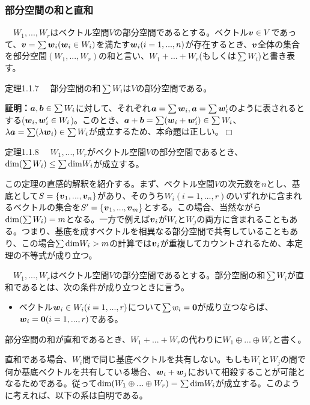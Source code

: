 \documentclass[dvipdfmx, 9pt, a4paper]{jsarticle}
\numberwithin{equation}{subsection}
\newcommand{\bm}[1]{{\mbox{\boldmath $#1$}}}
\def\qed{\hfill $\Box$}
\begin{document}
\subsubsection{部分空間の和と直和}
\begin{tcolorbox}[title=部分空間の和]
　$W_1, ..., W_r$はベクトル空間$V$の部分空間であるとする。ベクトル$\bm v \in V$であって、$\bm v = \sum \bm w_i (\bm w_i \in W_i)$を満たす$\bm w_i(i=1, ..., n)$が存在するとき、$\bm v$全体の集合を部分空間$(W_1, ..., W_r)$の和と言い、$W_1 + ... + W_r$(もしくは$\sum W_i$)と書き表す。
\end{tcolorbox}
\begin{itembox}[l]{定理1.1.7}
　部分空間の和$\sum W_i$は$V$の部分空間である。
\end{itembox}
{\bf 証明：}$\bm a, \bm b \in \sum W_i$に対して、それぞれ$\bm a=\sum \bm w_i, \bm a=\sum \bm w'_i$のように表されるとする($\bm w_i, \bm w'_i \in W_i$)。このとき、$\bm a+\bm b = \sum (\bm w_i+\bm w'_i) \in \sum W_i$、$\lambda \bm a = \sum (\lambda \bm w_i) \in \sum W_i$が成立するため、本命題は正しい。\qed
\begin{itembox}[l]{定理1.1.8}
　$W_1, ..., W_r$がベクトル空間$V$の部分空間であるとき、${\rm dim}(\sum W_i) \leq \sum {\rm dim}W_i$が成立する。
\end{itembox}\par
この定理の直感的解釈を紹介する。まず、ベクトル空間$V$の次元数を$n$とし、基底として$S=\{ \bm v_1, ..., \bm v_n \}$があり、そのうち$W_i(i=1,...,r)$のいずれかに含まれるベクトルの集合を$S'=\{\bm v_1, ..., \bm v_m \}$とする。この場合、当然ながら${\rm dim}(\sum W_i)=m$となる。一方で例えば$\bm v_i$が$W_i$と$W_j$の両方に含まれることもある。つまり、基底を成すベクトルを相異なる部分空間で共有していることもあり、この場合$\sum {\rm dim}W_i > m$の計算では$\bm v_i$が重複してカウントされるため、本定理の不等式が成り立つ。
\begin{tcolorbox}[title=直和]
　$W_1, ..., W_r$はベクトル空間$V$の部分空間であるとする。部分空間の和$\sum W_i$が直和であるとは、次の条件が成り立つときに言う。
\begin{itemize}
\item ベクトル$\bm w_i \in W_i(i=1, ..., r)$について$\sum w_i=\bm 0$が成り立つならば、$\bm w_i=\bm 0(i=1, ..., r)$である。
\end{itemize}
\end{tcolorbox}\par
部分空間の和が直和であるとき、$W_1+...+W_r$の代わりに$W_1 \oplus ... \oplus W_r$と書く。\par
直和である場合、$W_i$間で同じ基底ベクトルを共有しない。もしも$W_i$と$W_j$の間で何か基底ベクトルを共有している場合、$\bm w_i+\bm w_j$において相殺することが可能となるためである。従って${\rm dim}(W_1 \oplus ... \oplus W_r)=\sum {\rm dim}W_i$が成立する。このように考えれば、以下の系は自明である。
\end{document}
